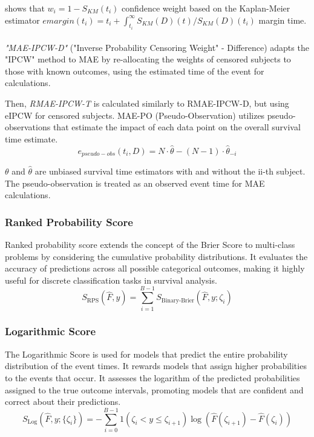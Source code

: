 \noindent \parencite{qi_effective_2023} shows that \(w_{i} = 1-S_{KM}(t_{i})\) confidence weight based on the Kaplan-Meier estimator \(emargin(t_{i})=t_{i}+\int_{t_{i}}^{\infty} S_{KM}(D)(t)/S_{KM}(D)(t_{i})\) margin time.
\\\\
\noindent \textit{"MAE-IPCW-D"} ("Inverse Probability Censoring Weight" - Difference) adapts the "IPCW" method to MAE by re-allocating the weights of censored subjects to those with known outcomes, using the estimated time of the event for calculations.
\par \noindent Then, \textit{RMAE-IPCW-T} is calculated similarly to RMAE-IPCW-D, but using eIPCW  for censored subjects. MAE-PO (Pseudo-Observation) utilizes pseudo-observations that estimate the impact of each data point on the overall survival time estimate. 
\begin{equation} \label{eq:maepsuedo}e_{pseudo-obs}(t_i, D) = N \cdot \hat{\theta} - (N - 1) \cdot \hat{\theta}_{-i}\end{equation}
\par \noindent \(\theta\) and \(\hat{\theta}\) are unbiased survival time estimators with and without the ii-th subject. The pseudo-observation is treated as an observed event time for MAE calculations.

\subsubsection{Ranked Probability Score}
Ranked probability score \parencite{yanagisawa_proper_2023} extends the concept of the Brier Score to multi-class problems by considering the cumulative probability distributions. It evaluates the accuracy of predictions across all possible categorical outcomes, making it highly useful for discrete classification tasks in survival analysis.
\begin{equation} \label{eq:ranked}S_{\text{RPS}}(\hat{F}, y) = \sum_{i=1}^{B-1} S_{\text{Binary-Brier}}(\hat{F}, y; \zeta_i)\end{equation}

\subsubsection{Logarithmic Score}
The Logarithmic Score \parencite{yanagisawa_proper_2023} is used for models that predict the entire probability distribution of the event times. It rewards models that assign higher probabilities to the events that occur. It assesses the logarithm of the predicted probabilities assigned to the true outcome intervals, promoting models that are confident and correct about their predictions.
\begin{equation} \label{eq:logscore}S_{\text{Log}}(\hat{F}, y; \{\zeta_i\}) = -\sum_{i=0}^{B-1} 1(\zeta_i < y \leq \zeta_{i+1}) \log(\hat{F}(\zeta_{i+1}) - \hat{F}(\zeta_i))\end{equation}

